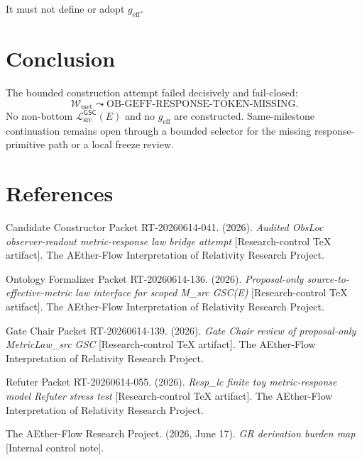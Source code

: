 \documentclass[11pt]{article}
\newcommand{\MetricData}{\mathcal{L}_{\mathrm{src}}^{\mathsf{GSC}}}
\newcommand{\geff}{g_{\mathrm{eff}}}
\begin{document}
It must not define or adopt \(\geff\).

\section{Conclusion}

The bounded construction attempt failed decisively and fail-closed:
\[
  \mathcal{W}_{\mathrm{met}}
  \leadsto
  \mathrm{OB\mbox{-}GEFF\mbox{-}RESPONSE\mbox{-}TOKEN\mbox{-}MISSING}.
\]
No non-bottom \(\MetricData(E)\) and no \(\geff\) are constructed.
Same-milestone continuation remains open through a bounded selector for the
missing response-primitive path or a local freeze review.

\section*{References}

Candidate Constructor Packet RT-20260614-041. (2026). \textit{Audited ObsLoc
observer-readout metric-response law bridge attempt} [Research-control TeX
artifact]. The AEther-Flow Interpretation of Relativity Research Project.

Ontology Formalizer Packet RT-20260614-136. (2026). \textit{Proposal-only
source-to-effective-metric law interface for scoped M\_src GSC(E)}
[Research-control TeX artifact]. The AEther-Flow Interpretation of Relativity
Research Project.

Gate Chair Packet RT-20260614-139. (2026). \textit{Gate Chair review of
proposal-only MetricLaw\_src GSC} [Research-control TeX artifact]. The
AEther-Flow Interpretation of Relativity Research Project.

Refuter Packet RT-20260614-055. (2026). \textit{Resp\_lc finite toy
metric-response model Refuter stress test} [Research-control TeX artifact].
The AEther-Flow Interpretation of Relativity Research Project.

The AEther-Flow Research Project. (2026, June 17). \textit{GR derivation
burden map} [Internal control note].
\end{document}
